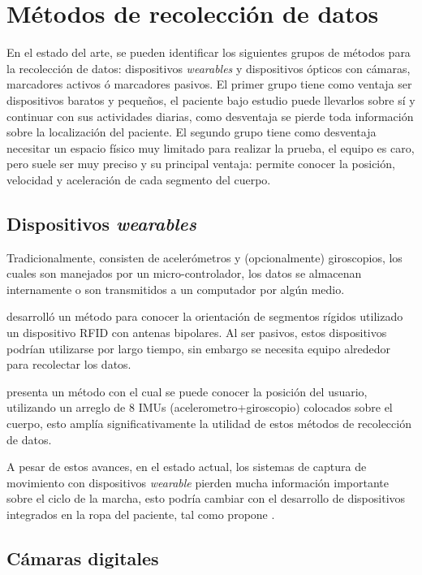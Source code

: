 \section[Métodos de recolección]{Métodos de recolección de datos}

En el estado del arte, se pueden identificar los siguientes grupos de métodos para la recolección de datos: dispositivos \emph{wearables} y dispositivos ópticos con cámaras, marcadores activos ó marcadores pasivos. El primer grupo tiene como ventaja ser dispositivos baratos y pequeños, el paciente bajo estudio puede llevarlos sobre sí y continuar con sus actividades diarias, como desventaja se pierde toda información sobre la localización del paciente. El segundo grupo tiene como desventaja necesitar un espacio físico muy limitado para realizar la prueba, el equipo es caro, pero suele ser muy preciso y su principal ventaja: permite conocer la posición, velocidad y aceleración de cada segmento del cuerpo. 

\subsection{Dispositivos \emph{wearables}}

Tradicionalmente, consisten de acelerómetros y (opcionalmente) giroscopios, los cuales son manejados por un micro-controlador, los datos se almacenan internamente o son transmitidos a un computador por algún medio.

\cite{krigslund} desarrolló un método para conocer la orientación de segmentos rígidos utilizado un dispositivo RFID con antenas bipolares. Al ser pasivos, estos dispositivos podrían utilizarse por largo tiempo, sin embargo se necesita equipo alrededor para recolectar los datos. 

\cite{yuan} presenta un método con el cual se puede conocer la posición del usuario, utilizando un arreglo de 8 IMUs (acelerometro+giroscopio) colocados sobre el cuerpo, esto amplía significativamente la utilidad de estos métodos de recolección de datos. 

A pesar de estos avances, en el estado actual, los sistemas de captura de movimiento con dispositivos \emph{wearable} pierden mucha información importante sobre el ciclo de la marcha, esto podría cambiar con el desarrollo de dispositivos integrados en la ropa del paciente, tal como propone \cite{menguc}.

\subsection{Cámaras digitales} 


